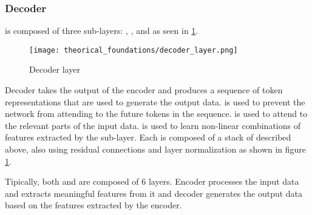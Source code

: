     \subsubsection{Decoder}

       is composed of three sub-layers: ,
      , and  as seen in \ref{fig:decoder_layer}.
      \begin{figure}[htbp]
        \centering
        \texttt{[image: theorical\_foundations/decoder\_layer.png]}
        \caption{Decoder layer\cite{vaswani2017attention}}
        \label{fig:decoder_layer}
      \end{figure}
      Decoder takes the output of the encoder and produces a sequence of token
      representations that are used to generate the output data\cite{vaswani2017attention}.
       is used to prevent the network from attending
      to the future tokens in the sequence\cite{vaswani2017attention}.
       is used to attend to the relevant parts of the
      input data\cite{vaswani2017attention}.
       is used to learn non-linear combinations of features
      extracted by the  sub-layer\cite{vaswani2017attention}.
      Each  is composed of a stack of  described
      above, also using residual connections and layer normalization as shown in
      figure \ref{fig:decoder_layer}.

    Tipically, both  and  are composed of 6 layers\cite{vaswani2017attention}.
    Encoder processes the input data and extracts meaningful features from it and decoder
    generates the output data based on the features extracted by the encoder\cite{vaswani2017attention}.
